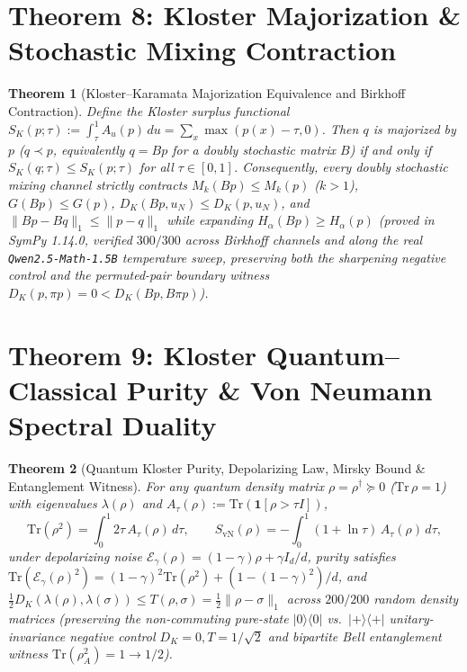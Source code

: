 \documentclass[11pt,letterpaper]{article}
\newtheorem{theorem}{Theorem}
\begin{document}
\section{Theorem 8: Kloster Majorization \& Stochastic Mixing Contraction}
\begin{theorem}[Kloster--Karamata Majorization Equivalence and Birkhoff Contraction]
\label{thm:majorization}
Define the Kloster surplus functional $S_K(p; \tau) := \int_\tau^1 A_u(p)\,du = \sum_x \max(p(x) - \tau, 0)$. Then $q$ is majorized by $p$ ($q \prec p$, equivalently $q = Bp$ for a doubly stochastic matrix $B$) if and only if $S_K(q; \tau) \le S_K(p; \tau)$ for all $\tau \in [0, 1]$. Consequently, every doubly stochastic mixing channel strictly contracts $M_k(Bp) \le M_k(p)$ ($k>1$), $G(Bp) \le G(p)$, $D_K(Bp, u_N) \le D_K(p, u_N)$, and $\|Bp - Bq\|_1 \le \|p - q\|_1$ while expanding $H_\alpha(Bp) \ge H_\alpha(p)$ (proved in SymPy 1.14.0, verified $300/300$ across Birkhoff channels and along the real \texttt{Qwen2.5-Math-1.5B} temperature sweep, preserving both the sharpening negative control and the permuted-pair boundary witness $D_K(p, \pi p) = 0 < D_K(Bp, B\pi p)$).
\end{theorem}

\section{Theorem 9: Kloster Quantum--Classical Purity \& Von Neumann Spectral Duality}
\begin{theorem}[Quantum Kloster Purity, Depolarizing Law, Mirsky Bound \& Entanglement Witness]
\label{thm:quantum}
For any quantum density matrix $\rho = \rho^\dagger \succeq 0$ ($\mathrm{Tr}\,\rho = 1$) with eigenvalues $\lambda(\rho)$ and $A_\tau(\rho) := \mathrm{Tr}(\mathbf{1}[\rho > \tau I])$,
\begin{equation}
  \mathrm{Tr}(\rho^2) = \int_0^1 2\tau\,A_\tau(\rho)\,d\tau,
  \qquad
  S_{\mathrm{vN}}(\rho) = -\int_0^1 (1+\ln\tau)\,A_\tau(\rho)\,d\tau,
\end{equation}
under depolarizing noise $\mathcal{E}_\gamma(\rho) = (1-\gamma)\rho + \gamma I_d/d$, purity satisfies $\mathrm{Tr}(\mathcal{E}_\gamma(\rho)^2) = (1-\gamma)^2\mathrm{Tr}(\rho^2) + (1-(1-\gamma)^2)/d$, and $\frac{1}{2}D_K(\lambda(\rho),\lambda(\sigma)) \le T(\rho,\sigma) = \frac{1}{2}\|\rho-\sigma\|_1$ across $200/200$ random density matrices (preserving the non-commuting pure-state $|0\rangle\langle 0|$ vs.\ $|+\rangle\langle +|$ unitary-invariance negative control $D_K=0, T=1/\sqrt{2}$ and bipartite Bell entanglement witness $\mathrm{Tr}(\rho_A^2)=1 \to 1/2$).
\end{theorem}
\end{document}
